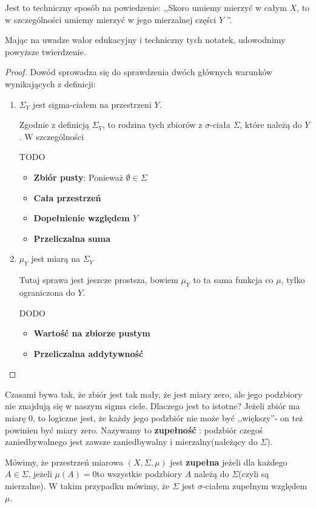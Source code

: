 Jest to techniczny sposób na powiedzenie: ,,Skoro umiemy mierzyć w całym $X$, to w szczególności umiemy mierzyć w jego mierzalnej części $Y$ ''.

Mając na uwadze walor edukacyjny i techniczny tych notatek, udowodnimy powyższe twierdzenie. 
\begin{proof}
	Dowód sprowadza się do sprawdzenia dwóch głównych warunków wynikających z definicji:
	\begin{enumerate}[label=\arabic*)]
		\item $\Sigma_{Y}$ jest sigma-ciałem na przestrzeni $Y$.

			Zgodnie z definicją $\Sigma _{\scriptscriptstyle Y}$, to rodzina tych zbiorów z $\sigma $-ciała $\Sigma $, które należą do $Y$. W szczególności

			TODO
			\begin{itemize}
				\item \textbf{Zbiór pusty}: Ponieważ $\emptyset \in \Sigma $ 
				\item \textbf{Cała przestrzeń} 
				\item \textbf{Dopełnienie względem $Y$}
				\item \textbf{Przeliczalna suma} 
			\end{itemize}
		\item $\mu_{\scriptscriptstyle Y}$ jest miarą na $\Sigma_{Y}$
			
			Tutaj sprawa jest jeszcze prostsza, bowiem $\mu_{\scriptscriptstyle Y}$ to ta sama funkcja co $\mu$, tylko ograniczona do $Y$.

			DODO
			\begin{itemize}
				\item \textbf{Wartość na zbiorze pustym}
				\item \textbf{Przeliczalna addytywność} 
			\end{itemize}
	\end{enumerate}
\end{proof} 

\begin{intuition}
	Czasami bywa tak, że zbiór jest tak mały, że jest miary zero, ale jego podzbiory nie znajdują się w naszym sigma ciele. Dlaczego jest to istotne? Jeżeli zbiór ma miarę 0, to logiczne jest, że każdy jego podzbiór nie może być ,,większy''- on też powinien być miary zero. Nazywamy to \textbf{zupełność} : podzbiór czegoś zaniedbywalnego jest zawsze zaniedbywalny i mierzalny(należący do $\Sigma $).  
\end{intuition} 
\begin{definition}
	Mówimy, że przestrzeń miarowa $\left( X,\Sigma,\mu \right) $ jest \textbf{zupełna} jeżeli dla każdego $A\in \Sigma$, jeżeli $\mu\left( A \right)= 0 $to wszystkie podzbiory $A$ należą do $\Sigma$(czyli są mierzalne). W takim przypadku mówimy, że $\Sigma$ jest  $\sigma$-ciałem zupełnym względem $\mu$.
\end{definition} 


